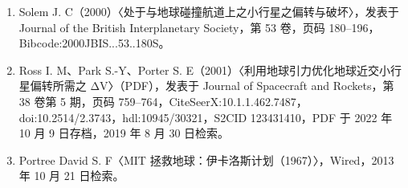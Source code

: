 \begin{enumerate}
\item Solem J. C（2000）〈处于与地球碰撞航道上之小行星之偏转与破坏〉，发表于 Journal of the British Interplanetary Society，第 53 卷，页码 180–196，Bibcode:2000JBIS...53..180S。
\item Ross I. M、Park S.-Y、Porter S. E（2001）〈利用地球引力优化地球近交小行星偏转所需之 ΔV〉（PDF），发表于 Journal of Spacecraft and Rockets，第 38 卷第 5 期，页码 759–764，CiteSeerX:10.1.1.462.7487，doi:10.2514/2.3743，hdl:10945/30321，S2CID 123431410，PDF 于 2022 年 10 月 9 日存档，2019 年 8 月 30 日检索。
\item Portree David S. F〈MIT 拯救地球：伊卡洛斯计划（1967）〉，Wired，2013 年 10 月 21 日检索。

\end{enumerate}
